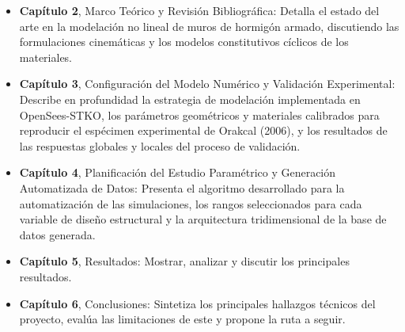 \begin{itemize}
  \item \textbf{Capítulo 2}, Marco Teórico y Revisión Bibliográfica: Detalla el estado del arte en la modelación no lineal de muros de hormigón armado, discutiendo las formulaciones cinemáticas y los modelos constitutivos cíclicos de los materiales.
  \item \textbf{Capítulo 3}, Configuración del Modelo Numérico y Validación Experimental: Describe en profundidad la estrategia de modelación implementada en OpenSees-STKO, los parámetros geométricos y materiales calibrados para reproducir el espécimen experimental de Orakcal (2006), y los resultados de las respuestas globales y locales del proceso de validación.
  \item \textbf{Capítulo 4}, Planificación del Estudio Paramétrico y Generación Automatizada de Datos: Presenta el algoritmo desarrollado para la automatización de las simulaciones, los rangos seleccionados para cada variable de diseño estructural y la arquitectura tridimensional de la base de datos generada.
  \item \textbf{Capítulo 5}, Resultados: Mostrar, analizar y discutir los principales resultados.
  \item \textbf{Capítulo 6}, Conclusiones: Sintetiza los principales hallazgos técnicos del proyecto, evalúa las limitaciones de este y propone la ruta a seguir.  
  
\end{itemize}
